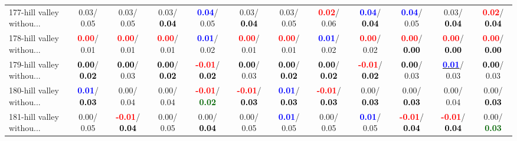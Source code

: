 \begin{table}[h]
\begin{center}
{\begin{tabular}{lc|c|c|c|c|c|c|c|c|c|c}
177-hill valley withou... &   0.03/  0.05 &   0.03/  0.05 &   0.03/\textcolor{black}{\textbf{  0.04}} & \textcolor{blue}{\textbf{  0.04}}/  0.05 &   0.03/\textcolor{black}{\textbf{  0.04}} &   0.03/  0.05 & \textcolor{red}{\textbf{  0.02}}/  0.06 & \textcolor{blue}{\textbf{  0.04}}/\textcolor{black}{\textbf{  0.04}} & \textcolor{blue}{\textbf{  0.04}}/  0.05 &   0.03/\textcolor{black}{\textbf{  0.04}} & \textcolor{red}{\textbf{  0.02}}/\textcolor{black}{\textbf{  0.04}} \\
178-hill valley withou... & \textcolor{red}{\textbf{  0.00}}/  0.01 & \textcolor{red}{\textbf{  0.00}}/  0.01 & \textcolor{red}{\textbf{  0.00}}/  0.01 & \textcolor{blue}{\textbf{  0.01}}/  0.02 & \textcolor{red}{\textbf{  0.00}}/  0.01 & \textcolor{red}{\textbf{  0.00}}/  0.01 & \textcolor{blue}{\textbf{  0.01}}/  0.02 & \textcolor{red}{\textbf{  0.00}}/  0.02 & \textcolor{red}{\textbf{  0.00}}/\textcolor{black}{\textbf{  0.00}} & \textcolor{red}{\textbf{  0.00}}/\textcolor{black}{\textbf{  0.00}} & \textcolor{red}{\textbf{  0.00}}/\textcolor{black}{\textbf{  0.00}} \\
179-hill valley withou... & \textcolor{black}{\textbf{  0.00}}/\textcolor{black}{\textbf{  0.02}} & \textcolor{black}{\textbf{  0.00}}/  0.03 & \textcolor{black}{\textbf{  0.00}}/\textcolor{black}{\textbf{  0.02}} & \textcolor{red}{\textbf{ -0.01}}/\textcolor{black}{\textbf{  0.02}} & \textcolor{black}{\textbf{  0.00}}/  0.03 & \textcolor{black}{\textbf{  0.00}}/\textcolor{black}{\textbf{  0.02}} & \textcolor{black}{\textbf{  0.00}}/\textcolor{black}{\textbf{  0.02}} & \textcolor{red}{\textbf{ -0.01}}/\textcolor{black}{\textbf{  0.02}} & \textcolor{black}{\textbf{  0.00}}/  0.03 & \underline{\textcolor{blue}{\textbf{  0.01}}}/  0.03 & \textcolor{black}{\textbf{  0.00}}/  0.03 \\
180-hill valley withou... & \textcolor{blue}{\textbf{  0.01}}/\textcolor{black}{\textbf{  0.03}} &   0.00/  0.04 &   0.00/  0.04 & \textcolor{red}{\textbf{ -0.01}}/\textcolor{darkgreen}{\textbf{  0.02}} & \textcolor{red}{\textbf{ -0.01}}/\textcolor{black}{\textbf{  0.03}} & \textcolor{blue}{\textbf{  0.01}}/\textcolor{black}{\textbf{  0.03}} & \textcolor{red}{\textbf{ -0.01}}/\textcolor{black}{\textbf{  0.03}} &   0.00/\textcolor{black}{\textbf{  0.03}} &   0.00/\textcolor{black}{\textbf{  0.03}} &   0.00/  0.04 &   0.00/\textcolor{black}{\textbf{  0.03}} \\
181-hill valley withou... &   0.00/  0.05 & \textcolor{red}{\textbf{ -0.01}}/\textcolor{black}{\textbf{  0.04}} &   0.00/  0.05 &   0.00/\textcolor{black}{\textbf{  0.04}} &   0.00/  0.05 & \textcolor{blue}{\textbf{  0.01}}/  0.05 &   0.00/  0.05 & \textcolor{blue}{\textbf{  0.01}}/  0.05 & \textcolor{red}{\textbf{ -0.01}}/\textcolor{black}{\textbf{  0.04}} & \textcolor{red}{\textbf{ -0.01}}/\textcolor{black}{\textbf{  0.04}} &   0.00/\textcolor{darkgreen}{\textbf{  0.03}} \\ \hline

\end{tabular}}
\end{center}
\end{table}
